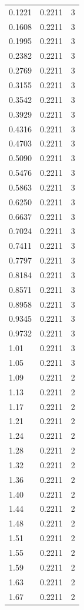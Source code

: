 \begin{longtable}{lrr}
  0.1221 & 0.2211 & 3 \\
  0.1608 & 0.2211 & 3 \\
  0.1995 & 0.2211 & 3 \\
  0.2382 & 0.2211 & 3 \\
  0.2769 & 0.2211 & 3 \\
  0.3155 & 0.2211 & 3 \\
  0.3542 & 0.2211 & 3 \\
  0.3929 & 0.2211 & 3 \\
  0.4316 & 0.2211 & 3 \\
  0.4703 & 0.2211 & 3 \\
  0.5090 & 0.2211 & 3 \\
  0.5476 & 0.2211 & 3 \\
  0.5863 & 0.2211 & 3 \\
  0.6250 & 0.2211 & 3 \\
  0.6637 & 0.2211 & 3 \\
  0.7024 & 0.2211 & 3 \\
  0.7411 & 0.2211 & 3 \\
  0.7797 & 0.2211 & 3 \\
  0.8184 & 0.2211 & 3 \\
  0.8571 & 0.2211 & 3 \\
  0.8958 & 0.2211 & 3 \\
  0.9345 & 0.2211 & 3 \\
  0.9732 & 0.2211 & 3 \\
  1.01 & 0.2211 & 3 \\
  1.05 & 0.2211 & 3 \\
  1.09 & 0.2211 & 2 \\
  1.13 & 0.2211 & 2 \\
  1.17 & 0.2211 & 2 \\
  1.21 & 0.2211 & 2 \\
  1.24 & 0.2211 & 2 \\
  1.28 & 0.2211 & 2 \\
  1.32 & 0.2211 & 2 \\
  1.36 & 0.2211 & 2 \\
  1.40 & 0.2211 & 2 \\
  1.44 & 0.2211 & 2 \\
  1.48 & 0.2211 & 2 \\
  1.51 & 0.2211 & 2 \\
  1.55 & 0.2211 & 2 \\
  1.59 & 0.2211 & 2 \\
  1.63 & 0.2211 & 2 \\
  1.67 & 0.2211 & 2 \\

\end{longtable}
